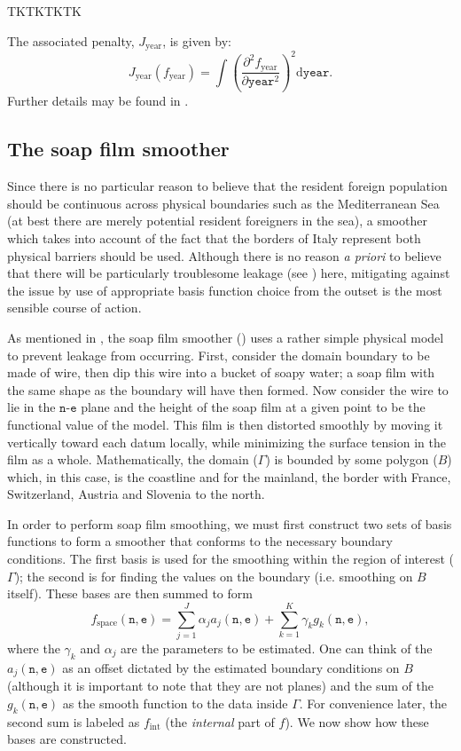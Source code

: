 TKTKTKTK

The associated penalty, $J_\text{year}$, is given by:
\begin{equation*}
J_\text{year}(f_\text{year})=\int\left( \frac{\partial^2 f_\text{year}}{\partial \texttt{year}^2} \right)^2 \text{d}\texttt{year}.
\end{equation*}
Further details may be found in .

\subsection{The soap film smoother \label{SF}}

Since there is no particular reason to believe that the resident foreign population should be continuous across physical boundaries such as the Mediterranean Sea (at best there are merely potential resident foreigners in the sea), a smoother which takes into account of the fact that the borders of Italy represent both physical barriers should be used. Although there is no reason \textit{a priori} to believe that there will be particularly troublesome leakage (see ) here, mitigating against the issue by use of appropriate basis function choice from the outset is the most sensible course of action. 

As mentioned in , the soap film smoother (\cite{soap}) uses a rather simple physical model to prevent leakage from occurring. First, consider the domain boundary to be made of wire, then dip this wire into a bucket of soapy water; a soap film with the same shape as the boundary will have then formed. Now consider the wire to lie in the $\texttt{n}$-$\texttt{e}$ plane and the height of the soap film at a given point to be the functional value of the model. This film is then distorted smoothly by moving it vertically toward each datum locally, while minimizing the surface tension in the film as a whole. Mathematically, the domain ($\Gamma$) is bounded by some polygon ($B$) which, in this case, is the coastline and for the mainland, the border with France, Switzerland, Austria and Slovenia to the north.

In order to perform soap film smoothing, we must first construct two sets of basis functions to form a smoother that conforms to the necessary boundary conditions. The first basis is used for the smoothing within the region of interest ($\Gamma$); the second is for finding the values on the boundary (i.e. smoothing on $B$ itself). These bases are then summed to form
$$
f_\text{space}(\texttt{n},\texttt{e})=\sum_{j=1}^J \alpha_j a_j(\texttt{n},\texttt{e}) + \sum_{k=1}^K \gamma_k g_k(\texttt{n},\texttt{e}),
$$
where the $\gamma_k$ and $\alpha_j$ are the parameters to be estimated. One can think of the $a_j(\texttt{n},\texttt{e})$ as an offset dictated by the estimated boundary conditions on $B$ (although it is important to note that they are not planes) and the sum of the $g_k(\texttt{n},\texttt{e})$ as the smooth function to the data inside $\Gamma$. For convenience later, the second sum is labeled as $f_\text{int}$ (the \textit{internal} part of $f$). We now show how these bases are constructed.

